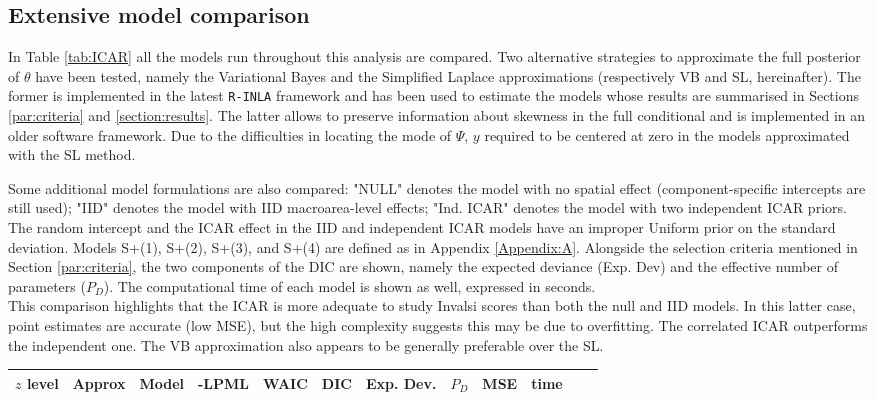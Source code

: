 \documentclass{book}
\begin{document}
\begin{appendices}

\section{Extensive model comparison} \label{Appendix:B}
In Table \ref{tab:ICAR} all the models run throughout this analysis are compared. Two alternative strategies to approximate the full posterior of $\theta$ have been tested, namely the Variational Bayes and the Simplified Laplace approximations (respectively VB and SL, hereinafter). The former is implemented in the latest \texttt{R-INLA} framework and has been used to estimate the models whose results are summarised in Sections \ref{par:criteria} and \ref{section:results}. The latter allows to preserve information about skewness in the full conditional and is implemented in an older software framework. Due to the difficulties in locating the mode of $\Psi$, $y$ required to be centered at zero in the models approximated with the SL method.

Some additional model formulations are also compared: "NULL" denotes the model with no spatial effect (component-specific intercepts are still used); "IID" denotes the model with IID macroarea-level effects; "Ind. ICAR" denotes the model with two independent ICAR priors. The random intercept and the ICAR effect in the IID and independent ICAR models have an improper Uniform prior on the standard deviation. Models  S+(1), S+(2), S+(3), and S+(4)  are defined as in Appendix \ref{Appendix:A}. Alongside the selection criteria mentioned in Section \ref{par:criteria}, the two components of the DIC are shown, namely the expected deviance (Exp. Dev) and the effective number of parameters ($P_D$). The computational time of each model is shown as well, expressed in seconds. \\

This comparison highlights that the ICAR is more adequate to study Invalsi scores than both the null and IID models. In this latter case, point estimates are accurate (low MSE), but the high complexity suggests this may be due to overfitting. The correlated ICAR outperforms the independent one. The VB approximation also appears to be generally preferable over the SL.

 
\begin{table}[ht]
\centering
\begin{tabular}{rlllrrrrrrrr}
  \hline
  $z$ level & Approx & Model & -LPML & WAIC & DIC & Exp. Dev. & $P_D$ & MSE & time \\ 
  \toprule


\end{tabular}
\end{table}
\end{appendices}
\end{document}

